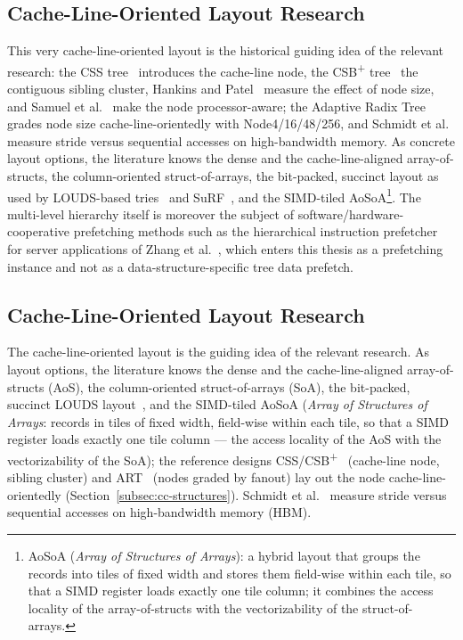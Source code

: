 \begin{nurlang}
\subsection{Cache-Line-Oriented Layout Research}\label{subsec:layout-research}
This very cache-line-oriented layout is the historical guiding idea of the relevant research: the CSS
tree~\cite{rao1999css} introduces the cache-line node, the CSB\textsuperscript{+} tree~\cite{rao2000csb}
the contiguous sibling cluster, Hankins and Patel~\cite{hankins2003nodesize} measure the effect of node
size, and Samuel et al.~\cite{samuel2005procaware} make the node processor-aware; the Adaptive Radix
Tree~\cite{leis2013art} grades node size cache-line-orientedly with Node4/16/48/256, and Schmidt et
al.~\cite{schmidt2025hbm} measure stride versus sequential accesses on high-bandwidth memory. As
concrete layout options, the literature knows the dense and the cache-line-aligned array-of-structs,
the column-oriented struct-of-arrays, the bit-packed, succinct layout as used by LOUDS-based
tries~\cite{jacobson1989louds} and SuRF~\cite{zhang2018surf}, and the SIMD-tiled
AoSoA\footnote{AoSoA (\emph{Array of Structures of Arrays}): a hybrid layout that groups the records into
tiles of fixed width and stores them field-wise within each tile, so that a SIMD register loads exactly
one tile column; it combines the access locality of the array-of-structs with the vectorizability of the
struct-of-arrays.}. The multi-level hierarchy itself is moreover the subject of software/hardware-cooperative
prefetching methods such as the hierarchical instruction prefetcher for server applications of Zhang et
al.~\cite{zhang2025hierarchical}, which enters this thesis as a prefetching instance and not as a data-structure-specific
tree data prefetch.
\end{nurlang}
\begin{nurkurz}
\subsection{Cache-Line-Oriented Layout Research}\label{subsec:layout-research}
The cache-line-oriented layout is the guiding idea of the relevant research. As layout options, the literature
knows the dense and the cache-line-aligned array-of-structs (AoS), the column-oriented struct-of-arrays (SoA),
the bit-packed, succinct LOUDS layout~\cite{jacobson1989louds,zhang2018surf}, and the SIMD-tiled AoSoA
(\emph{Array of Structures of Arrays}: records in tiles of fixed width, field-wise within each tile, so that a
SIMD register loads exactly one tile column --- the access locality of the AoS with the vectorizability of the
SoA); the reference designs CSS/CSB\textsuperscript{+}~\cite{rao1999css,rao2000csb} (cache-line node, sibling
cluster) and ART~\cite{leis2013art} (nodes graded by fanout) lay out the node cache-line-orientedly
(Section~\ref{subsec:cc-structures}). Schmidt et al.~\cite{schmidt2025hbm} measure stride versus sequential
accesses on high-bandwidth memory (HBM).
\end{nurkurz}

